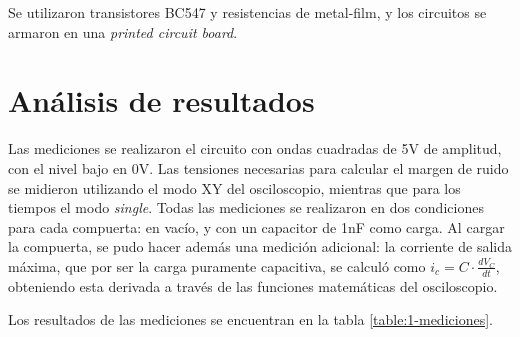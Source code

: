 \documentclass[../../e3_tp2_main.tex]{subfiles}
\begin{document}
Se utilizaron transistores BC547 y resistencias de metal-film, y los circuitos se armaron en una \textit{printed circuit board}. \par

\section{An\'alisis de resultados}

Las mediciones se realizaron el circuito con ondas cuadradas de 5V de amplitud, con el nivel bajo en 0V. Las tensiones necesarias para calcular el margen de ruido se midieron utilizando el modo XY del osciloscopio, mientras que para los tiempos el modo \textit{single}. Todas las mediciones se realizaron en dos condiciones para cada compuerta: en vac\'io, y con un capacitor de 1nF como carga. Al cargar la compuerta, se pudo hacer adem\'as una medici\'on adicional: la corriente de salida m\'axima, que por ser la carga puramente capacitiva, se calcul\'o como $i_c = C \cdot \frac{dV_C}{dt}$, obteniendo esta derivada a trav\'es de las funciones matem\'aticas del osciloscopio. \par

Los resultados de las mediciones se encuentran en la tabla \ref{table:1-mediciones}.\par

\end{document}
